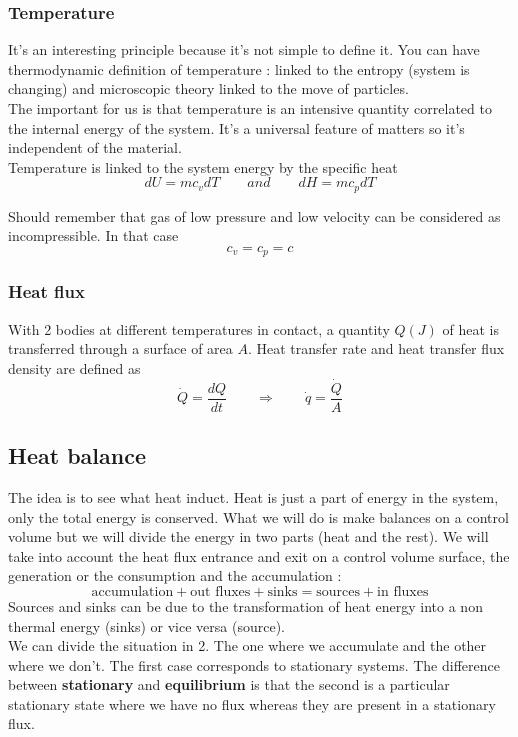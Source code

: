 	\subsubsection{Temperature}
		It's an interesting principle because it's not simple to define it. You can have thermodynamic definition of temperature : linked to the entropy (system is changing) and microscopic theory linked to the move of particles. \\
		The important for us is that temperature is an intensive quantity correlated to the internal energy of the system. It's a universal feature of matters so it's independent of the material. \\
		Temperature is linked to the system energy by the specific heat 
		\begin{equation}
			dU = mc_v dT \qquad and \qquad dH = mc_p dT
		\end{equation}

		Should remember that gas of low pressure and low velocity can be considered as incompressible. In that case 
		\begin{equation}
			c_v = c_p = c
		\end{equation}		 
		
	\subsubsection{Heat flux}
		With 2 bodies at different temperatures in contact, a quantity $Q(J)$ of heat is transferred through a surface of area $A$. Heat transfer rate and heat transfer flux density are defined as 
		\begin{equation}
			\dot{Q} = \frac{dQ}{dt} \qquad \Rightarrow \qquad \dot{q} = \frac{\dot{Q}}{A}
		\end{equation}
		
\subsection{Heat balance}
		The idea is to see what heat induct. Heat is just a part of energy in the system, only the total energy is conserved. What we will do is make balances on a control volume but we will divide the energy in two parts (heat and the rest). We will take into account the heat flux entrance and exit on a control volume surface, the generation or the consumption and the accumulation :
		\begin{equation}
			\mbox{accumulation} + \mbox{out fluxes} + \mbox{sinks} = \mbox{sources} + \mbox{in fluxes}
			\label{eq:3.4}
		\end{equation}
		Sources and sinks can be due to the transformation of heat energy into a non thermal energy (sinks) or vice versa (source). \\
		We can divide the situation in 2. The one where we accumulate and the other where we don't. The first case corresponds to stationary systems. The difference between \textbf{stationary }and \textbf{equilibrium} is that the second is a particular stationary state where we have no flux whereas they are present in a stationary flux. 

